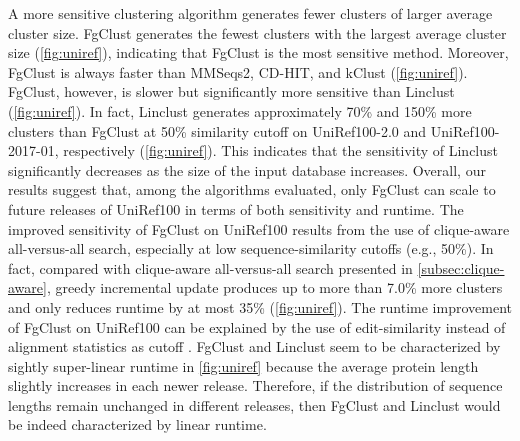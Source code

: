 \documentclass{bioinfo}
\begin{document}
A more sensitive clustering algorithm generates fewer clusters of larger average cluster size.
FgClust generates the fewest clusters with the largest average cluster size (\cref{fig:uniref}), indicating that FgClust is the most sensitive method.
Moreover, FgClust is always faster than MMSeqs2, CD-HIT, and kClust (\cref{fig:uniref}).
FgClust, however, is slower but significantly more sensitive than Linclust  (\cref{fig:uniref}).
In fact, Linclust generates approximately 70\% and 150\% more clusters than FgClust at 50\% similarity cutoff on UniRef100-2.0 and UniRef100-2017-01, respectively (\cref{fig:uniref}).
This indicates that the sensitivity of Linclust significantly decreases as the size of the input database increases. 
Overall, our results suggest that, among the algorithms evaluated, only FgClust can scale to future releases of UniRef100 in terms of both sensitivity and runtime.
The improved sensitivity of FgClust on UniRef100 
results from the use of 
clique-aware all-versus-all search, especially at low sequence-similarity cutoffs (e.g., 50\%).
In fact, compared with clique-aware all-versus-all search presented in \cref{subsec:clique-aware}, greedy incremental update produces up to more than 7.0\% more clusters and only reduces runtime by at most 35\% (\cref{fig:uniref}).
The runtime improvement of FgClust on UniRef100 can be explained by 
the use of 
edit-similarity instead of alignment statistics as cutoff \citep{vsovsic2017edlib}.
FgClust and Linclust seem to be characterized by sightly super-linear runtime in \cref{fig:uniref} because the average protein length slightly increases in each newer release. Therefore, if the distribution of sequence lengths remain unchanged in different releases, then FgClust and Linclust would be indeed characterized by linear runtime.
\end{document}
